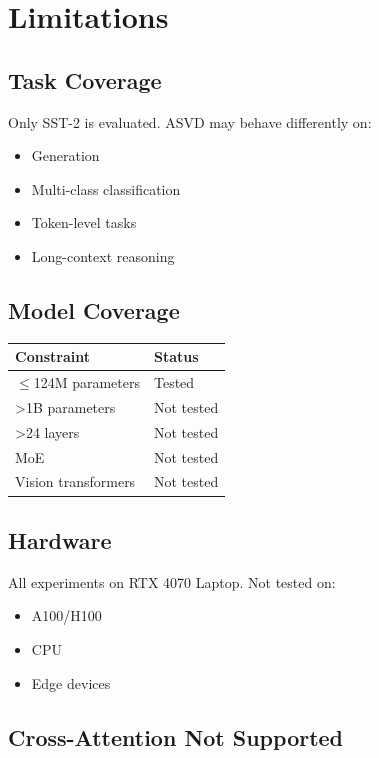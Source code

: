 
\section{Limitations}

\subsection{Task Coverage}

Only SST-2 is evaluated. ASVD may behave differently on:
\begin{itemize}
\item Generation
\item Multi-class classification
\item Token-level tasks
\item Long-context reasoning

\end{itemize}
\subsection{Model Coverage}

\begin{table}[H]
\centering
\small
\begin{tabular}{ll}
\toprule
\textbf{Constraint} & \textbf{Status} \\
\midrule
$\le$124M parameters & Tested \\
\textgreater{}1B parameters & Not tested \\
\textgreater{}24 layers & Not tested \\
MoE & Not tested \\
Vision transformers & Not tested \\
\bottomrule
\end{tabular}
\end{table}

\subsection{Hardware}

All experiments on RTX 4070 Laptop. Not tested on:
\begin{itemize}
\item A100/H100
\item CPU
\item Edge devices

\end{itemize}
\subsection{Cross-Attention Not Supported}

